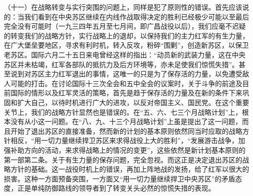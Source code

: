 （十一）在战略转变与实行突围的问题上，同样是犯了原则性的错误。首先应该说的：当我们看到在中央苏区继续在内线作战取得决定的胜利已经极少可能以至最后完全没有可能时（一九三四年五月至七月间，即广昌战役以后），我们应毫不迟疑的转变我们的战略方针，实行战略上的退却，以保持我们的主力红军的有生力量，在广大堡垒要地区，寻求有利时机，转入反攻，粉碎“围剿”，创造新苏区，以保卫老苏区。国际六月二十五日来电曾经这样的指出：“动员新的武装力量，这在中央苏区并未枯竭，红军各部队的抵抗力及后方环境等，亦未足使我们惊慌失措”。甚至说到对苏区主力红军退出的事情，这唯一的只是为了保存活的力量，以免遭受敌人可能的打击。在讨论国际十三次全会和五中全会的议案时，关于斗争的前途及目前国际的情形以及红军灵活的策略，首先是趋于保存活的力量及在新的条件下来巩固和扩大自己，以待时机进行广大的进攻，以反对帝国主义、国民党。在这个重要关节上，我们的战略方针显然也是错误的。在“五、六、七三个月战略计划”上，根本没有从小这一问题。在“八、九、十三个月战略计划”上虽是提出了这一问题，而且开始了退出苏区的直接准备，然而新的计划的基本原则依然同当时应取的战略方针相反，“用一切力量继续捍卫苏区来求得战役上大的胜利”，“发展游击战争，加强补助方向的活动，来求得战略上的情况的变更”，这些依然是新计划基本原则的第一部第二条。关于有生力量的保存问题，完全忽视。而这正是决定退出苏区的战略方针的基础。这一战役时机上的错误，再加上阵地战的发扬，给了红军以很大的损害。这种一方面预备突围，一方面又“用一切力量继续捍卫中央苏区”的矛盾态度，正是单纯防御路线的领导者到了转变关头必然的惊慌失措的表现。

